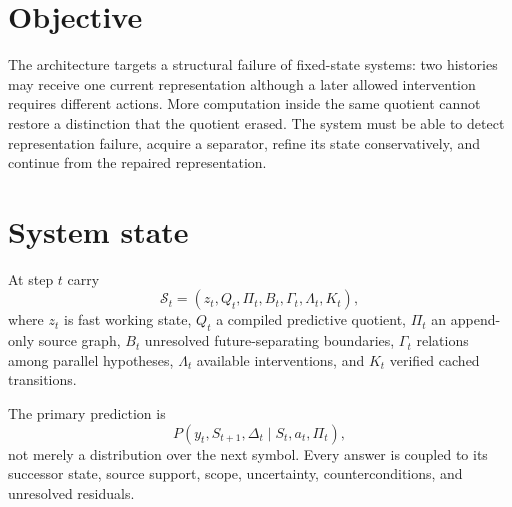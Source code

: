 \documentclass[11pt,a4paper]{article}
\begin{document}
\MakeResearchTitle
\MakeResearchContents
{}
\section{Objective}
The architecture targets a structural failure of fixed-state systems: two histories may receive one current representation although a later allowed intervention requires different actions. More computation inside the same quotient cannot restore a distinction that the quotient erased. The system must be able to detect representation failure, acquire a separator, refine its state conservatively, and continue from the repaired representation.

\section{System state}
At step $t$ carry
\begin{equation}
\mathcal S_t=(z_t,Q_t,\Pi_t,B_t,\Gamma_t,\Lambda_t,K_t),
\end{equation}
where $z_t$ is fast working state, $Q_t$ a compiled predictive quotient, $\Pi_t$ an append-only source graph, $B_t$ unresolved future-separating boundaries, $\Gamma_t$ relations among parallel hypotheses, $\Lambda_t$ available interventions, and $K_t$ verified cached transitions.

The primary prediction is
\begin{equation}
P(y_t,S_{t+1},\Delta_t\mid S_t,a_t,\Pi_t),
\end{equation}
not merely a distribution over the next symbol. Every answer is coupled to its successor state, source support, scope, uncertainty, counterconditions, and unresolved residuals.
\end{document}
